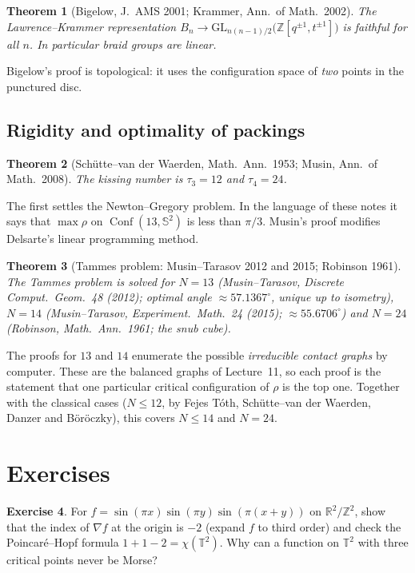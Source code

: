 \documentclass[11pt,openany]{book}
\theoremstyle{plain}
\newtheorem{theorem}{Theorem}[chapter]
\theoremstyle{definition}
\newtheorem{exercise}[theorem]{Exercise}
\theoremstyle{remark}
\newcommand{\R}{\mathbb{R}}
\newcommand{\Z}{\mathbb{Z}}
\newcommand{\T}{\mathbb{T}}
\newcommand{\Sph}{\mathbb{S}}          %
\newcommand{\GL}{\mathrm{GL}}
\newcommand{\Conf}{\operatorname{Conf}}
\newcommand{\kiss}{\tau}               %
\begin{document}
\begin{theorem}[Bigelow, J.\ AMS 2001; Krammer, Ann.\ of Math.\ 2002]\label{TOP:thm:linear}
The Lawrence--Krammer representation $B_n\to\GL_{n(n-1)/2}\big(\Z[q^{\pm1},t^{\pm1}]\big)$ is faithful for all
$n$. In particular braid groups are linear.
\end{theorem}
\noindent Bigelow's proof is topological: it uses the configuration space of \emph{two} points in the punctured disc.

\subsection*{Rigidity and optimality of packings}

\begin{theorem}[Sch\"utte--van der Waerden, Math.\ Ann.\ 1953; Musin, Ann.\ of Math.\ 2008]
The kissing number is $\kiss_3=12$ and $\kiss_4=24$.
\end{theorem}
\noindent The first settles the Newton--Gregory problem. In the language of these notes it says that
$\max\rho$ on $\Conf(13,\Sph^2)$ is less than $\pi/3$. Musin's proof modifies Delsarte's linear programming method.

\begin{theorem}[Tammes problem: Musin--Tarasov 2012 and 2015; Robinson 1961]
The Tammes problem is solved for $N=13$ (Musin--Tarasov, Discrete Comput.\ Geom.\ 48 (2012); optimal angle
$\approx57.1367^\circ$, unique up to isometry), $N=14$ (Musin--Tarasov, Experiment.\ Math.\ 24 (2015);
$\approx55.6706^\circ$) and $N=24$ (Robinson, Math.\ Ann.\ 1961; the snub cube).
\end{theorem}
\noindent The proofs for $13$ and $14$ enumerate the possible \emph{irreducible contact graphs} by computer.
These are the balanced graphs of Lecture~11, so each proof is the statement that one particular
critical configuration of $\rho$ is the top one. Together with the classical cases ($N\le12$, by Fejes
T\'oth, Sch\"utte--van der Waerden, Danzer and B\"or\"oczky), this covers $N\le14$ and $N=24$.

\section*{Exercises}

\begin{exercise}
For $f=\sin(\pi x)\sin(\pi y)\sin(\pi(x+y))$ on $\R^2/\Z^2$, show that the index of $\nabla f$ at the origin
is $-2$ (expand $f$ to third order) and check the Poincar\'e--Hopf formula $1+1-2=\chi(\T^2)$. Why can a
function on $\T^2$ with three critical points never be Morse?
\end{exercise}
\end{document}
